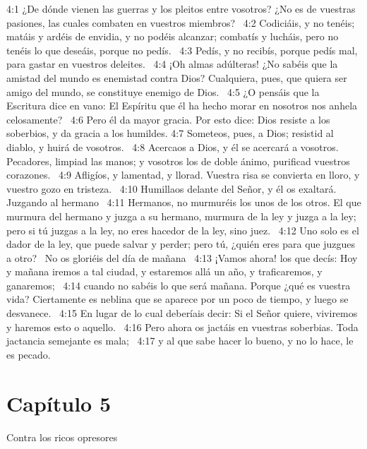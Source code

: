 4:1 ¿De dónde vienen las guerras y los pleitos entre vosotros? ¿No es de vuestras pasiones, las cuales combaten en vuestros miembros?  
4:2 Codiciáis, y no tenéis; matáis y ardéis de envidia, y no podéis alcanzar; combatís y lucháis, pero no tenéis lo que deseáis, porque no pedís.  
4:3 Pedís, y no recibís, porque pedís mal, para gastar en vuestros deleites.  
4:4 ¡Oh almas adúlteras! ¿No sabéis que la amistad del mundo es enemistad contra Dios? Cualquiera, pues, que quiera ser amigo del mundo, se constituye enemigo de Dios.  
4:5 ¿O pensáis que la Escritura dice en vano: El Espíritu que él ha hecho morar en nosotros nos anhela celosamente?  
4:6 Pero él da mayor gracia. Por esto dice: Dios resiste a los soberbios, y da gracia a los humildes. 
4:7 Someteos, pues, a Dios; resistid al diablo, y huirá de vosotros.  
4:8 Acercaos a Dios, y él se acercará a vosotros. Pecadores, limpiad las manos; y vosotros los de doble ánimo, purificad vuestros corazones.  
4:9 Afligíos, y lamentad, y llorad. Vuestra risa se convierta en lloro, y vuestro gozo en tristeza.  
4:10 Humillaos delante del Señor, y él os exaltará.  
Juzgando al hermano  
4:11 Hermanos, no murmuréis los unos de los otros. El que murmura del hermano y juzga a su hermano, murmura de la ley y juzga a la ley; pero si tú juzgas a la ley, no eres hacedor de la ley, sino juez.  
4:12 Uno solo es el dador de la ley, que puede salvar y perder; pero tú, ¿quién eres para que juzgues a otro?  
No os gloriéis del día de mañana  
4:13 ¡Vamos ahora! los que decís: Hoy y mañana iremos a tal ciudad, y estaremos allá un año, y traficaremos, y ganaremos;  
4:14 cuando no sabéis lo que será mañana. Porque ¿qué es vuestra vida? Ciertamente es neblina que se aparece por un poco de tiempo, y luego se desvanece.  
4:15 En lugar de lo cual deberíais decir: Si el Señor quiere, viviremos y haremos esto o aquello.  
4:16 Pero ahora os jactáis en vuestras soberbias. Toda jactancia semejante es mala;  
4:17 y al que sabe hacer lo bueno, y no lo hace, le es pecado.  
\section*{Capítulo 5 }
Contra los ricos opresores  

